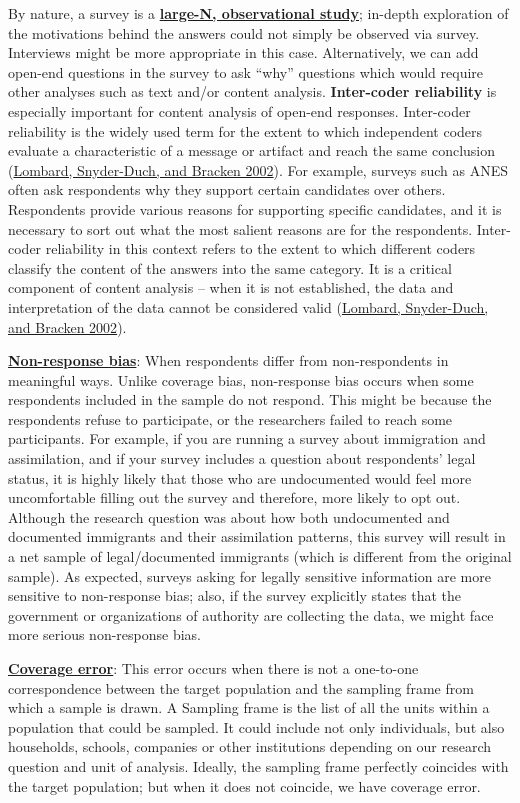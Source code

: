 \documentclass{book}
\begin{document}
By nature, a survey is a \textbf{\uline{large-N, observational study}};
in-depth exploration of the motivations behind the answers could not simply be
observed via survey. Interviews might be more appropriate in this case.
Alternatively, we can add open-end questions in the survey to ask ``why''
questions which would require other analyses such as text and/or content
analysis. \textbf{Inter-coder reliability} is especially important for content
analysis of open-end responses. Inter-coder reliability is the widely used
term for the extent to which independent coders evaluate a characteristic of a
message or artifact and reach the same conclusion
(\protect\hyperlink{ref-lombard2002content}{Lombard, Snyder-Duch, and Bracken
2002}). For example, surveys such as ANES often ask respondents why they
support certain candidates over others. Respondents provide various reasons
for supporting specific candidates, and it is necessary to sort out what the
most salient reasons are for the respondents. Inter-coder reliability in this
context refers to the extent to which different coders classify the content of
the answers into the same category. It is a critical component of content
analysis -- when it is not established, the data and interpretation of the
data cannot be considered valid
(\protect\hyperlink{ref-lombard2002content}{Lombard, Snyder-Duch, and Bracken
2002}).

\textbf{\uline{Non-response bias}}: When respondents differ from
non-respondents in meaningful ways. Unlike coverage bias, non-response bias
occurs when some respondents included in the sample do not respond. This might
be because the respondents refuse to participate, or the researchers failed to
reach some participants. For example, if you are running a survey about
immigration and assimilation, and if your survey includes a question about
respondents' legal status, it is highly likely that those who are undocumented
would feel more uncomfortable filling out the survey and therefore, more
likely to opt out. Although the research question was about how both
undocumented and documented immigrants and their assimilation patterns, this
survey will result in a net sample of legal/documented immigrants (which is
different from the original sample). As expected, surveys asking for legally
sensitive information are more sensitive to non-response bias; also, if the
survey explicitly states that the government or organizations of authority are
collecting the data, we might face more serious non-response bias.

\textbf{\uline{Coverage error}}: This error occurs when there is not a
one-to-one correspondence between the target population and the sampling frame
from which a sample is drawn. A Sampling frame is the list of all the units
within a population that could be sampled. It could include not only
individuals, but also households, schools, companies or other institutions
depending on our research question and unit of analysis. Ideally, the sampling
frame perfectly coincides with the target population; but when it does not
coincide, we have coverage error.
\end{document}
